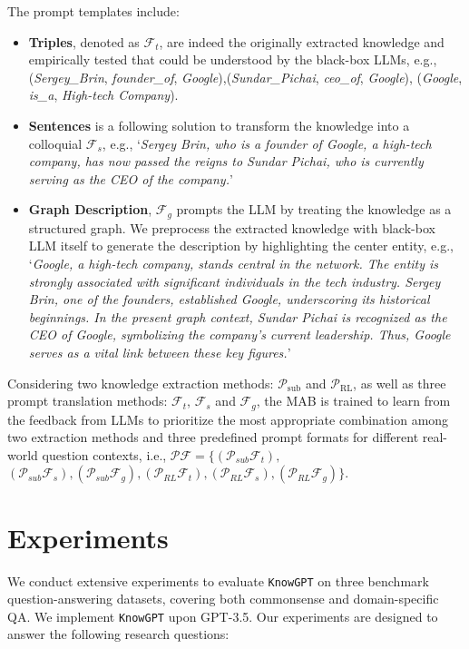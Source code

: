 \documentclass{article}
\theoremstyle{boldremark}
\begin{document}
The prompt templates include:
 
\begin{itemize} [leftmargin=*]
    \item \textbf{Triples}, denoted as $\mathcal{F}_{t}$, are indeed the originally extracted knowledge and empirically tested that could be understood by the black-box LLMs, e.g., (\textit{Sergey\_Brin}, \textit{founder\_of}, \textit{Google}),(\textit{Sundar\_Pichai}, \textit{ceo\_of}, \textit{Google}), (\textit{Google}, \textit{is\_a}, \textit{High-tech Company}).
    \item \textbf{Sentences} is a following solution to transform the knowledge into a colloquial  $\mathcal{F}_{s}$, e.g., ‘\textit{Sergey Brin, who is a founder of Google, a high-tech company, has now passed the reigns to Sundar Pichai, who is currently serving as the CEO of the company.}’
    \item  \textbf{Graph Description}, $\mathcal{F}_{g}$ prompts the LLM by treating the knowledge as a structured graph. We preprocess the extracted knowledge with black-box LLM itself to generate the description by highlighting the center entity, e.g., ‘\textit{Google, a high-tech company, stands central in the network. The entity is strongly associated with significant individuals in the tech industry. Sergey Brin, one of the founders, established Google, underscoring its historical beginnings. In the present graph context, Sundar Pichai is recognized as the CEO of Google, symbolizing the company's current leadership. Thus, Google serves as a vital link between these key figures.}’ 

\end{itemize}

Considering two knowledge extraction methods: $\mathcal{P}_\text{sub}$ and $\mathcal{P}_\text{RL}$, as well as three prompt translation methods: $\mathcal{F}_{t}$, $\mathcal{F}_{s}$ and $\mathcal{F}_{g}$, the MAB is trained to learn from the feedback from LLMs to prioritize the most appropriate combination among two extraction methods and three predefined prompt formats for different real-world question contexts, i.e., 
 $\mathcal{P}\mathcal{F} = \{(\mathcal{P}_{sub}\mathcal{F}_{t}),$
$(\mathcal{P}_{sub}\mathcal{F}_{s}),
(\mathcal{P}_{sub}\mathcal{F}_{g}),
(\mathcal{P}_{RL}\mathcal{F}_{t}),
(\mathcal{P}_{RL}\mathcal{F}_{s}),
(\mathcal{P}_{RL}\mathcal{F}_{g})\}$.





\section{Experiments}
We conduct extensive experiments to evaluate \texttt{KnowGPT} on three benchmark question-answering datasets, covering both commonsense and domain-specific QA. We implement \texttt{KnowGPT} upon GPT-3.5.
Our experiments are designed to answer the following research questions:
\end{document}

